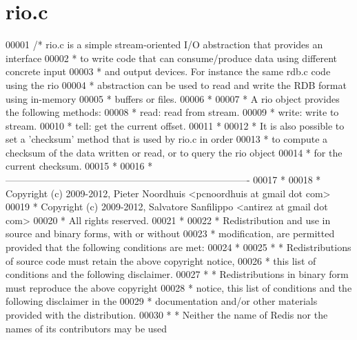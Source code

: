\hypertarget{rio_8c_source}{}\section{rio.\+c}
\label{rio_8c_source}

\begin{DoxyCode}
00001 \textcolor{comment}{/* rio.c is a simple stream-oriented I/O abstraction that provides an interface}
00002 \textcolor{comment}{ * to write code that can consume/produce data using different concrete input}
00003 \textcolor{comment}{ * and output devices. For instance the same rdb.c code using the rio}
00004 \textcolor{comment}{ * abstraction can be used to read and write the RDB format using in-memory}
00005 \textcolor{comment}{ * buffers or files.}
00006 \textcolor{comment}{ *}
00007 \textcolor{comment}{ * A rio object provides the following methods:}
00008 \textcolor{comment}{ *  read: read from stream.}
00009 \textcolor{comment}{ *  write: write to stream.}
00010 \textcolor{comment}{ *  tell: get the current offset.}
00011 \textcolor{comment}{ *}
00012 \textcolor{comment}{ * It is also possible to set a 'checksum' method that is used by rio.c in order}
00013 \textcolor{comment}{ * to compute a checksum of the data written or read, or to query the rio object}
00014 \textcolor{comment}{ * for the current checksum.}
00015 \textcolor{comment}{ *}
00016 \textcolor{comment}{ * ----------------------------------------------------------------------------}
00017 \textcolor{comment}{ *}
00018 \textcolor{comment}{ * Copyright (c) 2009-2012, Pieter Noordhuis <pcnoordhuis at gmail dot com>}
00019 \textcolor{comment}{ * Copyright (c) 2009-2012, Salvatore Sanfilippo <antirez at gmail dot com>}
00020 \textcolor{comment}{ * All rights reserved.}
00021 \textcolor{comment}{ *}
00022 \textcolor{comment}{ * Redistribution and use in source and binary forms, with or without}
00023 \textcolor{comment}{ * modification, are permitted provided that the following conditions are met:}
00024 \textcolor{comment}{ *}
00025 \textcolor{comment}{ *   * Redistributions of source code must retain the above copyright notice,}
00026 \textcolor{comment}{ *     this list of conditions and the following disclaimer.}
00027 \textcolor{comment}{ *   * Redistributions in binary form must reproduce the above copyright}
00028 \textcolor{comment}{ *     notice, this list of conditions and the following disclaimer in the}
00029 \textcolor{comment}{ *     documentation and/or other materials provided with the distribution.}
00030 \textcolor{comment}{ *   * Neither the name of Redis nor the names of its contributors may be used}

\end{DoxyCode}
